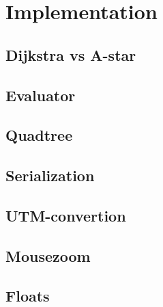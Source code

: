 \chapter{Implementation}
\label{IMPL}
\section{Dijkstra vs A-star}
\label{IMPL-DVA}

\section{Evaluator}
\label{IMPL-EVA}

\section{Quadtree}
\label{IMPL-QT}

\section{Serialization}
\label{IMPL-SERI}

\section{UTM-convertion}
\label{IMPL-UTM}

\section{Mousezoom}
\label{IMPL-MZ}

\section{Floats}
\label{IMPL-F}